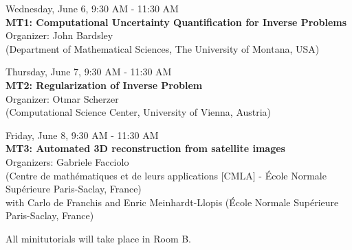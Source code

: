 \begin{center}{\large{
      Wednesday, June 6, 9:30 AM - 11:30 AM \\
      \textbf{MT1: Computational Uncertainty Quantification for Inverse Problems}\\
      Organizer: John Bardsley \\(Department of Mathematical Sciences, The University of Montana, USA)}}
\end{center}
\vspace{0.5cm}
\begin{center}{\large{
      Thursday, June 7, 9:30 AM - 11:30 AM \\
      \textbf{MT2: Regularization of Inverse Problem}\\
      Organizer: Otmar Scherzer\\ (Computational Science Center, University of Vienna, Austria) }}
\end{center}

\vspace{0.5cm}
\begin{center}{\large{
      Friday, June 8, 9:30 AM - 11:30 AM \\
      \textbf{MT3: Automated 3D reconstruction from satellite images}\\
      Organizers: Gabriele Facciolo\\ (Centre de math\'ematiques et de leurs applications [CMLA] - \'Ecole Normale Sup\'erieure Paris-Saclay, France) \\with Carlo de Franchis and Enric Meinhardt-Llopis (\'Ecole Normale Sup\'erieure Paris-Saclay, France)  }}
\end{center}

{\Large{All minitutorials will take place in Room B.}}
